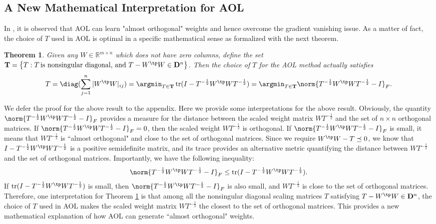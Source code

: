 \documentclass{article} \usepackage{iclr2023_conference,times}
\newcommand{\D}{\mathbf{D}}
\newtheorem{theorem}{Theorem}
\DeclareMathOperator*{\tr}{tr}
\newcommand{\0}{\mathbf{0} }
\begin{document}
\subsection{A New Mathematical Interpretation for AOL}

In \cite{prach2022almost}, it is observed that AOL can learn "almost orthogonal" weights and hence overcome the gradient vanishing issue. 
As a matter of fact, 
the choice of $T$ used in AOL is optimal in a specific mathematical sense as formalized with the next theorem. 

\begin{theorem}\label{thm:main2}
Given any $W \in \mathbb{R}^{m \times n}$ which does not have zero columns, define the set $\mathbf{T}=\left\{T: T\,\mbox{is nonsingular diagonal, and}\,\, T-W^\tp W\in \D^n\right\}$. 
Then the choice of $T$ for the AOL method    actually satisfies
\begin{align*}
    T=\diag(\sum_{j=1}^n |W^\tp W|_{ij})=\argmin_{T\in \mathbf{T}} \tr(I-T^{-\frac{1}{2}}W^\tp W T^{-\frac{1}{2}})=\argmin_{T\in \mathbf{T}} \norm{T^{-\frac{1}{2}}W^\tp W T^{-\frac{1}{2}}-I}_F.
\end{align*}
\end{theorem}
We defer the proof for the above result to the appendix.
Here we provide some interpretations for the above result.  Obviously, the quantity $\norm{T^{-\frac{1}{2}}W^\tp W T^{-\frac{1}{2}}-I}_F$ provides a measure for the distance between the scaled weight matrix $WT^{-\frac{1}{2}}$ and the set of $n\times n$ orthogonal matrices. If $\norm{T^{-\frac{1}{2}}W^\tp W T^{-\frac{1}{2}}-I}_F=0$, then the scaled weight $W T^{-\frac{1}{2}}$ is orthogonal. If $\norm{T^{-\frac{1}{2}}W^\tp W T^{-\frac{1}{2}}-I}_F$ is small, it means that  $W T^{-\frac{1}{2}}$ is ``almost orthogonal" and close to the set of orthogonal matrices.  Since we require $W^\tp W-T\preceq 0$, we know that  $I-T^{-\frac{1}{2}}W^\tp W T^{-\frac{1}{2}}$ is a positive semidefinite matrix, and its trace provides an alternative metric quantifying the distance between $WT^{-\frac{1}{2}}$
and the set of orthogonal matrices. Importantly, we have the following inequality:  
\begin{align*}
\norm{T^{-\frac{1}{2}}W^\tp W T^{-\frac{1}{2}}-I}_F\le \tr(I-T^{-\frac{1}{2}}W^\tp W T^{-\frac{1}{2}}).
\end{align*}
If $\tr(I-T^{-\frac{1}{2}}W^\tp W T^{-\frac{1}{2}})$ is small, then $\norm{T^{-\frac{1}{2}}W^\tp W T^{-\frac{1}{2}}-I}_F$ is also small, and $WT^{-\frac{1}{2}}$ is close to the set of orthogonal matrices. Therefore, one interpretation for Theorem \ref{thm:main2} is that among all the nonsingular diagonal scaling matrices $T$ satisfying $T-W^\tp W\in \D^n$, the choice of $T$ used in AOL makes the scaled weight matrix $WT^{-\frac{1}{2}}$ the closest to the set of orthogonal matrices. This provides a new mathematical explanation of how AOL can generate ``almost orthogonal" weights. 
\end{document}
